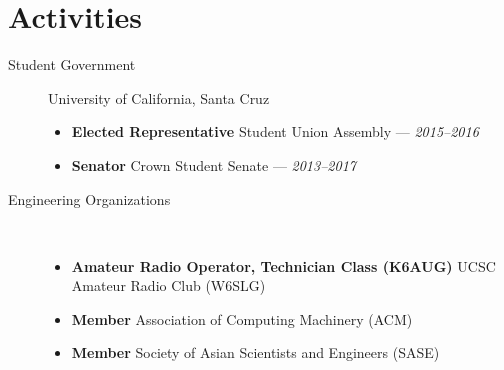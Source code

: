 \documentclass[10pt]{article}
\begin{document}
\section*{Activities}
\begin{description}
  \item[Student Government] University of California, Santa Cruz
    \begin{itemize}
      \item \textbf{Elected Representative} Student Union Assembly --- \textit{2015--2016}
      \item \textbf{Senator} Crown Student Senate --- \textit{2013--2017}
    \end{itemize}
  \item[Engineering Organizations] ~
    \begin{itemize}
      \item \textbf{Amateur Radio Operator, Technician Class (K6AUG)} UCSC Amateur Radio Club (W6SLG)
      \item \textbf{Member} Association of Computing Machinery (ACM)
      \item \textbf{Member} Society of Asian Scientists and Engineers (SASE)
    \end{itemize}
\end{description}
\begin{comment}
\item[Volunteering] ~
  \begin{itemize}
    \item \textbf{Marketing Communications Chairperson}
      San Francisco Fil-Am Lions Club --- \textit{2015--present}
    \item \textbf{Attendee Safety Staff (Rovers Dept.)} FanimeCon, San Jose ---
      \textit{2013--present}
  \end{itemize}
\item[Relevant Hobbies] ~
  \begin{itemize}
    \item \textbf{\href{https://coord.info/PR62PFW}{Geocaching (4U6U57)}} 350
      finds
    \item \textbf{Pokemon Go} Team Instinct, Level 21
    \item \textbf{Ingress} Enlightened, Level 5
    \item \textbf{Google Maps Contributor/Local Guide} Level 5, formerly Google
      Maps Maker with 500+ edits
  \end{itemize}
\end{comment}
\end{document}
